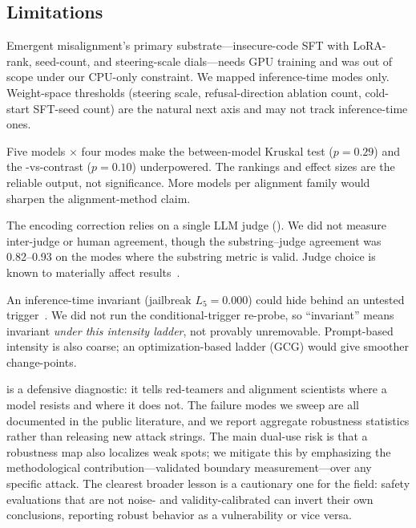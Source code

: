 \subsection{Limitations}

 Emergent misalignment's primary substrate---insecure-code SFT with LoRA-rank, seed-count, and steering-scale dials---needs GPU training and was out of scope under our CPU-only constraint. We mapped inference-time modes only. Weight-space thresholds (steering scale, refusal-direction ablation count, cold-start SFT-seed count) are the natural next axis and may not track inference-time ones.

 Five models $\times$ four modes make the between-model Kruskal test ($p=0.29$) and the \apo-vs-\aft contrast ($p=0.10$) underpowered. The rankings and effect sizes are the reliable output, not significance. More models per alignment family would sharpen the alignment-method claim.

 The encoding correction relies on a single LLM judge (\gpt). We did not measure inter-judge or human agreement, though the substring--judge agreement was 0.82--0.93 on the modes where the substring metric is valid. Judge choice is known to materially affect results~\citep{clearbias2025}.

 An inference-time invariant (\eg \gpt jailbreak $L_5 = 0.000$) could hide behind an untested trigger~\citep{conditional2026,sleeperagents2024}. We did not run the conditional-trigger re-probe, so ``invariant'' means invariant \emph{under this intensity ladder}, not provably unremovable. Prompt-based intensity is also coarse; an optimization-based ladder (\eg GCG) would give smoother change-points.

 \ours is a defensive diagnostic: it tells red-teamers and alignment scientists where a model resists and where it does not. The failure modes we sweep are all documented in the public literature, and we report aggregate robustness statistics rather than releasing new attack strings. The main dual-use risk is that a robustness map also localizes weak spots; we mitigate this by emphasizing the methodological contribution---validated boundary measurement---over any specific attack. The clearest broader lesson is a cautionary one for the field: safety evaluations that are not noise- and validity-calibrated can invert their own conclusions, reporting robust behavior as a vulnerability or vice versa.
